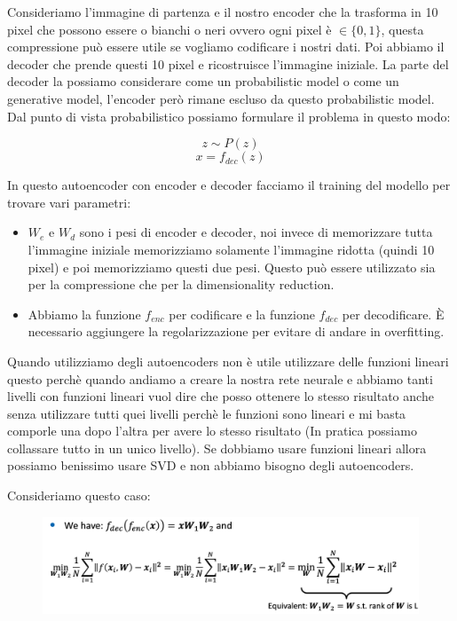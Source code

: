 \documentclass[14pt]{extreport}
\begin{document}
Consideriamo l'immagine di partenza e il nostro encoder che la trasforma in 10 pixel che possono essere o bianchi o neri ovvero ogni pixel è $\in \{0,1\}$, 
questa compressione può essere utile se vogliamo codificare i nostri dati.
Poi abbiamo il decoder che prende questi 10 pixel e ricostruisce l'immagine iniziale.
La parte del decoder la possiamo considerare come un probabilistic model o come un generative model, l'encoder però rimane escluso da questo probabilistic model.
Dal punto di vista probabilistico possiamo formulare il problema in questo modo:

$$z \sim P(z)$$
$$x = f_{dec}(z)$$

In questo autoencoder con encoder e decoder facciamo il training del modello per trovare vari parametri:
\begin{itemize}
\item $W_e$ e $W_d$ sono i pesi di encoder e decoder, noi invece di memorizzare tutta l'immagine iniziale memorizziamo solamente l'immagine ridotta (quindi 10 pixel)
e poi memorizziamo questi due pesi. Questo può essere utilizzato sia per la compressione che per la dimensionality reduction.
\item Abbiamo la funzione $f_{enc}$ per codificare e la funzione $f_{dec}$ per decodificare. È necessario aggiungere la regolarizzazione per evitare di andare in
overfitting.
\end{itemize}

Quando utilizziamo degli autoencoders non è utile utilizzare delle funzioni lineari questo perchè quando andiamo a creare la nostra rete neurale e abbiamo tanti 
livelli con funzioni lineari vuol dire che posso ottenere lo stesso risultato anche senza utilizzare tutti quei livelli perchè le funzioni sono lineari e mi basta
comporle una dopo l'altra per avere lo stesso risultato (In pratica possiamo collassare tutto in un unico livello).
Se dobbiamo usare funzioni lineari allora possiamo benissimo usare SVD e non abbiamo bisogno degli autoencoders.

Consideriamo questo caso:


\begin{figure}[H] 
\centering
\includegraphics[width=0.7\linewidth]{536.jpeg}
\end{figure}
\end{document}
